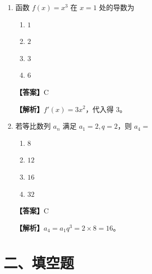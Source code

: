 \documentclass[UTF8,a4paper]{ctexart}
\begin{document}
\begin{enumerate}[leftmargin=2em,itemsep=0.8em]
\item 函数 $f(x)=x^3$ 在 $x=1$ 处的导数为

\begin{enumerate}[label=\Alph*.,itemsep=0.2em,parsep=0pt]

\item $1$

\item $2$

\item $3$

\item $6$

\end{enumerate}


\par\noindent\textbf{【答案】}C
\par\noindent\textbf{【解析】}$f'(x)=3x^2$，代入得 $3$。



\item 若等比数列 $a_n$ 满足 $a_1=2,q=2$，则 $a_4=$

\begin{enumerate}[label=\Alph*.,itemsep=0.2em,parsep=0pt]

\item $8$

\item $12$

\item $16$

\item $32$

\end{enumerate}


\par\noindent\textbf{【答案】}C
\par\noindent\textbf{【解析】}$a_4=a_1q^3=2\times8=16$。


\end{enumerate}
\vspace{1em}


\section*{二、填空题}
\end{document}

